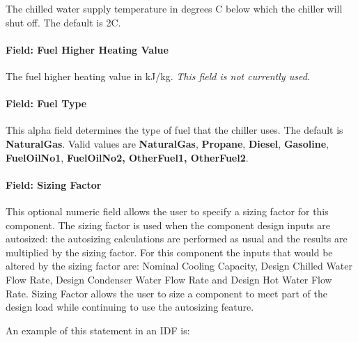 The chilled water supply temperature in degrees C below which the chiller will shut off. The default is 2C.

\paragraph{Field: Fuel Higher Heating Value}\label{field-fuel-higher-heating-value-2-000}

The fuel higher heating value in kJ/kg. \emph{This field is not currently used}.

\paragraph{Field: Fuel Type}\label{field-fuel-type-2-000}

This alpha field determines the type of fuel that the chiller uses. The default is \textbf{NaturalGas}. Valid values are \textbf{NaturalGas}, \textbf{Propane}, \textbf{Diesel}, \textbf{Gasoline}, \textbf{FuelOilNo1}, \textbf{FuelOilNo2, OtherFuel1, OtherFuel2}.

\paragraph{Field: Sizing Factor}\label{field-sizing-factor-8}

This optional numeric field allows the user to specify a sizing factor for this component. The sizing factor is used when the component design inputs are autosized: the autosizing calculations are performed as usual and the results are multiplied by the sizing factor. For this component the inputs that would be altered by the sizing factor are: Nominal Cooling Capacity, Design Chilled Water Flow Rate, Design Condenser Water Flow Rate and Design Hot Water Flow Rate. Sizing Factor allows the user to size a component to meet part of the design load while continuing to use the autosizing feature.

An example of this statement in an IDF is:

